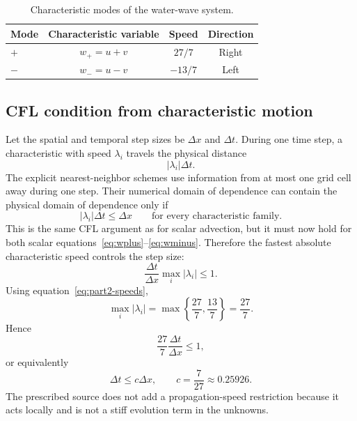 \begin{table}[htbp]
\centering
\caption{Characteristic modes of the water-wave system.}
\begin{tabular}{@{}lccc@{}}
\toprule
Mode & Characteristic variable & Speed & Direction\\
\midrule
$+$ & $w_+=u+v$ & $27/7$ & Right\\
$-$ & $w_-=u-v$ & $-13/7$ & Left\\
\bottomrule
\end{tabular}
\end{table}

\subsection{CFL condition from characteristic motion}

Let the spatial and temporal step sizes be $\Delta x$ and $\Delta t$. During
one time step, a characteristic with speed $\lambda_i$ travels the physical
distance
\begin{equation}
 |\lambda_i|\Delta t.
\end{equation}
The explicit nearest-neighbor schemes use information from at most one grid
cell away during one step. Their numerical domain of dependence can contain
the physical domain of dependence only if
\begin{equation}
 |\lambda_i|\Delta t\leq\Delta x
 \qquad\text{for every characteristic family.}
 \label{eq:part2-cfl-each}
\end{equation}
This is the same CFL argument as for scalar advection, but it must now hold for
both scalar equations~\eqref{eq:wplus}--\eqref{eq:wminus}. Therefore the
fastest absolute characteristic speed controls the step size:
\begin{equation}
 \frac{\Delta t}{\Delta x}
 \max_i|\lambda_i|\leq1.
\end{equation}
Using equation~\eqref{eq:part2-speeds},
\[
 \max_i|\lambda_i|
 =\max\left\{\frac{27}{7},\frac{13}{7}\right\}
 =\frac{27}{7}.
\]
Hence
\begin{equation}
 \frac{27}{7}\frac{\Delta t}{\Delta x}\leq1,
\end{equation}
or equivalently
\begin{equation}
 \boxed{
 \Delta t\leq c\Delta x,
 \qquad
 c=\frac{7}{27}\approx0.25926.}
 \label{eq:part2-cfl-final}
\end{equation}
The prescribed source does not add a propagation-speed restriction because it
acts locally and is not a stiff evolution term in the unknowns.

